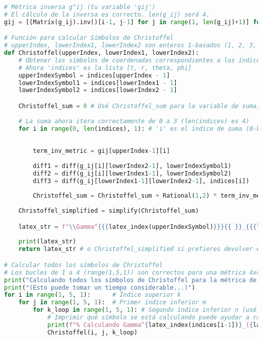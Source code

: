 \begin{lstlisting}[language=Python, caption=Python example]
# Métrica inversa g^ij (tu variable 'gij')
# El cálculo de la inversa es correcto. len(g_ij) será 4.
gij = [[Matrix(g_ij).inv()[i-1, j-1] for j in range(1, len(g_ij)+1)] for i in range(1, len(g_ij)+1)]

# Función para calcular Símbolos de Christoffel
# upperIndex, lowerIndex1, lowerIndex2 son enteros 1-basados (1, 2, 3, 4)
def Christoffel(upperIndex, lowerIndex1, lowerIndex2):
    # Obtener los símbolos de coordenadas correspondientes a los índices
    # Ahora 'indices' es la lista [t, r, theta, phi]
    upperIndexSymbol = indices[upperIndex - 1]
    lowerIndexSymbol1 = indices[lowerIndex1 - 1]
    lowerIndexSymbol2 = indices[lowerIndex2 - 1]

    Christoffel_sum = 0 # Usé Christoffel_sum para la variable de suma, pero tu 'Christoffel = 0' original también funciona debido al alcance.
    
    # La suma ahora itera correctamente de 0 a 3 (len(indices) es 4)
    for i in range(0, len(indices), 1): # 'i' es el índice de suma (0-basado)
        
    
        term_inv_metric = gij[upperIndex-1][i]
        
        diff1 = diff(g_ij[i][lowerIndex2-1], lowerIndexSymbol1)
        diff2 = diff(g_ij[i][lowerIndex1-1], lowerIndexSymbol2)
        diff3 = diff(g_ij[lowerIndex1-1][lowerIndex2-1], indices[i])
        
        Christoffel_sum = Christoffel_sum + Rational(1,2) * term_inv_metric * (diff1 + diff2 - diff3)
    
    Christoffel_simplified = simplify(Christoffel_sum)

    latex_str = f"\\Gamma^{{{latex_index(upperIndexSymbol)}}}{{ }}_{{{latex_index(lowerIndexSymbol1)} {latex_index(lowerIndexSymbol2)}}} &= {latex(Christoffel_simplified)} \\\\"
    
    print(latex_str)
    return latex_str # o Christoffel_simplified si prefieres devolver el valor SymPy

# Calcular todos los símbolos de Christoffel
# Los bucles de 1 a 4 (range(1,5,1)) son correctos para una métrica 4x4
print("Calculando todos los símbolos de Christoffel para la métrica de Kerr:")
print("(Esto puede tomar un tiempo considerable...)")
for i in range(1, 5, 1):      # Índice superior k
    for j in range(1, 5, 1):  # Primer índice inferior m
        for k_loop in range(1, 5, 1): # Segundo índice inferior n (usé k_loop para evitar sobreescribir la k del bucle externo si la usaras)
            # Imprimir qué símbolo se está calculando puede ayudar a rastrear el progreso
            print(f"% Calculando Gamma^{latex_index(indices[i-1])}_({latex_index(indices[j-1])}{latex_index(indices[k_loop-1])})")
            Christoffel(i, j, k_loop)

\end{lstlisting}